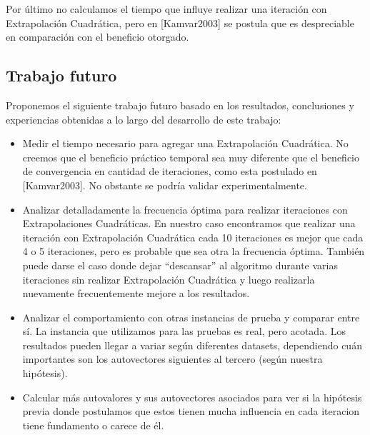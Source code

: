 Por último no calculamos el tiempo que influye realizar una iteración con
Extrapolación Cuadrática, pero en [Kamvar2003] se postula que es despreciable en
comparación con el beneficio otorgado.

\subsection{Trabajo futuro}

Proponemos el siguiente trabajo futuro basado en los resultados, conclusiones y
experiencias obtenidas a lo largo del desarrollo de este trabajo:

\begin{itemize}

\item Medir el tiempo necesario para agregar una Extrapolación Cuadrática. No
creemos que el beneficio práctico temporal sea muy diferente que el beneficio
de convergencia en cantidad de iteraciones, como esta postulado en [Kamvar2003].
No obstante se podría validar experimentalmente.

\item Analizar detalladamente la frecuencia óptima para realizar iteraciones
con Extrapolaciones Cuadráticas. En nuestro caso encontramos que realizar una
iteración con Extrapolación Cuadrática cada 10 iteraciones es mejor que cada 4
o 5 iteraciones, pero es probable que sea otra la frecuencia óptima. También
puede darse el caso donde dejar ``descansar'' al algoritmo durante varias
iteraciones sin realizar Extrapolación Cuadrática y luego realizarla nuevamente
frecuentemente mejore a los resultados.

\item Analizar el comportamiento con otras instancias de prueba y comparar
entre sí. La instancia que utilizamos para las pruebas es real, pero acotada.
Los resultados pueden llegar a variar según diferentes datasets, dependiendo
cuán importantes son los autovectores siguientes al tercero (según nuestra
hipótesis).

\item Calcular más autovalores y sus autovectores asociados para ver si la
hipótesis previa donde postulamos que estos tienen mucha influencia en cada
iteracion tiene fundamento o carece de él.

\end{itemize}

